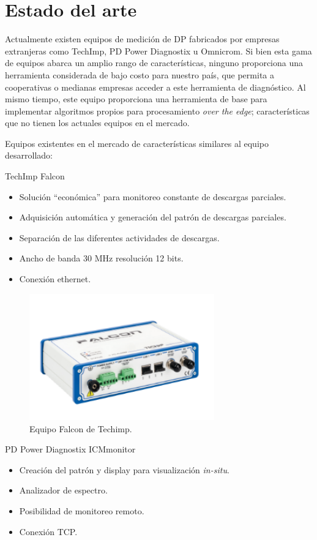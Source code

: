 \section{Estado del arte}
Actualmente existen equipos de medición de DP fabricados por empresas extranjeras como TechImp, PD Power Diagnostix u Omnicrom. Si bien esta gama de equipos abarca un amplio rango de características, ninguno proporciona una herramienta considerada de bajo costo para nuestro país, que permita a cooperativas o medianas empresas acceder a este herramienta de diagnóstico. Al mismo tiempo, este equipo proporciona una herramienta de base para implementar algoritmos propios para procesamiento \textit{over the edge}; características que no tienen los actuales equipos en el mercado. 

Equipos existentes en el mercado de características similares al equipo desarrollado:

TechImp Falcon \citep{falconWeb:1}
\begin{itemize}
\item Solución “económica” para monitoreo constante de descargas parciales.
\item Adquisición automática y generación del patrón de descargas parciales.
\item Separación de las diferentes actividades de descargas.
\item Ancho de banda 30 MHz resolución 12 bits.
\item Conexión ethernet.
\end{itemize}

\begin{figure}[h!]
	\centering
	\includegraphics[width=80mm]{./Figures/arte1.png}
	\caption{Equipo Falcon de Techimp.}
	\label{fig:arte1}
\end{figure}


\vspace{15mm}
PD Power Diagnostix ICMmonitor \citep{pdWeb:1}
\begin{itemize}
\item Creación del patrón y display para visualización \textit{in-situ}.
\item Analizador de espectro.
\item Posibilidad de monitoreo remoto.
\item Conexión TCP.
\end{itemize}

